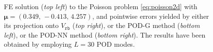 \documentclass[longtitle]{elsarticle}
\numberwithin{equation}{section}
\theoremstyle{theorem}
\theoremstyle{definition}
\theoremstyle{remark}
\theoremstyle{proposition}
\numberwithin{figure}{section}
\newcommand{\bg}[1]{\boldsymbol{#1}}
\begin{document}
\begin{figure}[t!]
			
			
			\caption{FE solution (\emph{top left}) to the Poisson problem \eqref{eq:poisson2d} with $\bg{\mu} = (0.349, \, -0.413, \, 4.257)$, and pointwise errors yielded by either its projection onto $V_{\texttt{rb}}$ (\emph{top right}), or the POD-G method (\emph{bottom left}), or the POD-NN method (\emph{bottom right}). The results have been obtained by employing $L = 30$ POD modes.}
			\label{fig:poisson2d-fig2}
		\end{figure}
\end{document}
